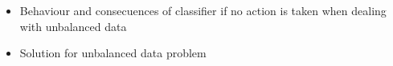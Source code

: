 \begin{itemize}
	\item Behaviour and consecuences of classifier if no action is taken when dealing with unbalanced data
	\item Solution for unbalanced data problem
\end{itemize}